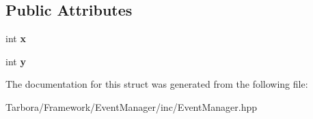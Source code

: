 \subsection*{Public Attributes}
\begin{DoxyCompactItemize}
\item 
\mbox{\label{structTarbora_1_1WindowMoveEvent_a2b8ee792637ecb426169a33e401bb8d5}} 
int {\bfseries x}
\item 
\mbox{\label{structTarbora_1_1WindowMoveEvent_acc8294c3f92c14972c7caa92a9e5be41}} 
int {\bfseries y}
\end{DoxyCompactItemize}


The documentation for this struct was generated from the following file\+:\begin{DoxyCompactItemize}
\item 
Tarbora/\+Framework/\+Event\+Manager/inc/Event\+Manager.\+hpp\end{DoxyCompactItemize}
